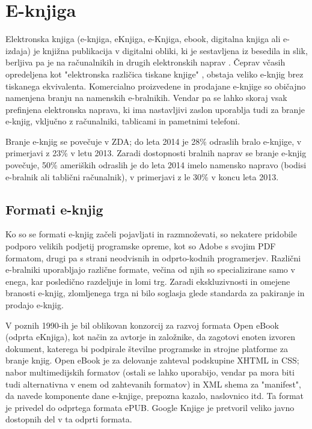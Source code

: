 \documentclass[a4paper, 12pt]{book}
\begin{document}
\section{E-knjiga}
\label{eknjiga}
Elektronska knjiga (e-knjiga, eKnjiga, e-Knjiga, ebook, digitalna knjiga ali e-izdaja) je knjižna publikacija v digitalni obliki, ki je sestavljena iz besedila in slik, berljiva pa je na računalnikih in drugih elektronskih naprav \cite{7}. Čeprav včasih opredeljena kot "elektronska različica tiskane knjige" \cite{8}, obstaja veliko e-knjig brez tiskanega ekvivalenta. Komercialno proizvedene in prodajane e-knjige so običajno namenjena branju na namenskih e-bralnikih. Vendar pa se lahko skoraj vsak prefinjena elektronska naprava, ki ima nastavljivi zaslon uporablja tudi za branje e-knjig, vključno z računalniki, tablicami in pametnimi telefoni.

Branje e-knjig se povečuje v ZDA; do leta 2014 je 28\% odraslih bralo e-knjige, v primerjavi z 23\% v letu 2013. Zaradi dostopnosti bralnih naprav se branje e-knjig povečuje, 50\% ameriških odraslih je do leta 2014 imelo namensko napravo (bodisi e-bralnik ali tablični računalnik), v primerjavi z le 30\% v koncu leta 2013. \cite{9} 

\subsection{Formati e-knjig}
\label{eknjiga_formati}
Ko so se formati e-knjig začeli pojavljati in razmnoževati, so nekatere pridobile podporo velikih podjetij programske opreme, kot so Adobe s svojim PDF formatom, drugi pa s strani neodvisnih in odprto-kodnih programerjev. Različni e-bralniki uporabljajo različne formate, večina od njih so specializirane samo v enega, kar posledično razdeljuje in lomi trg. Zaradi ekskluzivnosti in omejene branosti e-knjig, zlomljenega trga ni bilo soglasja glede standarda za pakiranje in prodajo e-knjig. 

V poznih 1990-ih je bil oblikovan konzorcij za razvoj formata Open eBook (odprta eKnjiga), kot način za avtorje in založnike, da zagotovi enoten izvoren dokument, katerega bi podpirale številne  programske in strojne platforme za branje knjig. Open eBook je za delovanje zahteval podskupine XHTML in CSS; nabor multimedijskih formatov (ostali se lahko uporabijo, vendar pa mora biti tudi alternativna v enem od zahtevanih formatov) in XML shema za "manifest", da navede komponente dane e-knjige, prepozna kazalo, naslovnico itd. Ta format je privedel do odprtega formata ePUB. Google Knjige je pretvoril veliko javno dostopnih del v ta odprti formata. \cite{10}
\end{document}
